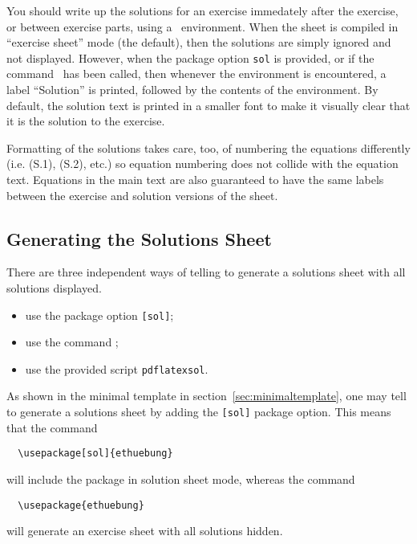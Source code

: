 \documentclass[11pt,a4paper]{article}
\begin{document}
You should write up the solutions for an exercise immedately after the exercise, or
between exercise parts, using
a~ environment. When the sheet is compiled in ``exercise sheet'' mode
(the default), then the solutions are simply ignored and not displayed. However, when the
package option {\tt sol} is provided, or if the command~
has been called, then whenever the environment  is encountered, a label
``Solution'' is printed, followed by the contents of the environment. By default, the
solution text is printed in a smaller font to make it visually clear that it is the
solution to the exercise.

Formatting of the solutions takes care, too, of numbering the equations differently
(i.e. (S.1), (S.2), etc.) so equation numbering does not collide with the equation
text. Equations in the main text are also guaranteed to have the same
labels between the exercise and solution versions of the sheet.

\subsection{Generating the Solutions Sheet}
\label{sec:generateSolutions}

There are three independent ways of telling \ethuebung{} to generate a solutions sheet
with all solutions displayed.
\begin{itemize}
\item use the package option \texttt{[sol]};
\item use the command ;
\item use the provided script \texttt{pdflatexsol}.
\end{itemize}

As shown in the minimal template in section~\ref{sec:minimaltemplate}, one may tell
\ethuebung{} to generate a solutions sheet by adding the \texttt{[sol]} package
option. This means that the command
{\setlength\pkgverbatimoutsidespacing{-3mm}
\begin{pkgverbatim}[-6mm]
\begin{verbatim}
  \usepackage[sol]{ethuebung}
\end{verbatim}
\end{pkgverbatim}}
will include the \ethuebung{} package in solution sheet mode, whereas the command
{\setlength\pkgverbatimoutsidespacing{-3mm}
\begin{pkgverbatim}[-6mm]
\begin{verbatim}
  \usepackage{ethuebung}
\end{verbatim}
\end{pkgverbatim}}
will generate an exercise sheet with all solutions hidden.
\end{document}
